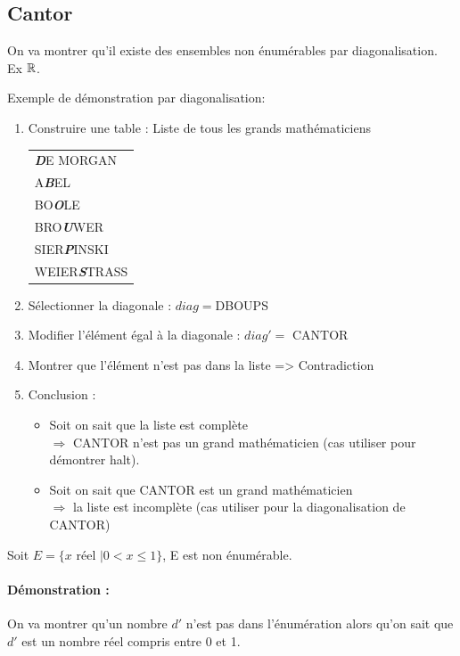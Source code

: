\subsection{Cantor}
\label{sub:cantor}
On va montrer qu'il existe des ensembles non énumérables par diagonalisation. Ex $\mathbb{R}$.
\begin{myexem}
	Exemple de démonstration par diagonalisation: 
	\begin{enumerate}
		\item Construire une table : Liste de tous les grands
			mathématiciens \\	
			\begin{tabular}{l}
				\textit{\textbf{D}}E MORGAN \\
				A\textit{\textbf{B}}EL\\
				BO\textit{\textbf{O}}LE\\
				BRO\textit{\textbf{U}}WER\\
				SIER\textit{\textbf{P}}INSKI\\
				WEIER\textit{\textbf{S}}TRASS\\
			\end{tabular}
		\item Sélectionner la diagonale : $diag = $DBOUPS
		\item Modifier l'élément égal à la diagonale : $diag' =$ CANTOR
		\item Montrer que l'élément n'est pas dans la liste => Contradiction
		\item Conclusion :
			\begin{itemize}
				\item Soit on sait que la liste est complète\\
					$ \Rightarrow$ CANTOR n'est pas un grand
				mathématicien (cas utiliser pour démontrer
				halt).
				\item Soit on sait que CANTOR est un grand
					mathématicien \\
					$ \Rightarrow$ la liste est incomplète
				(cas utiliser pour la diagonalisation de CANTOR)
			\end{itemize}
	\end{enumerate}
\end{myexem}

\begin{mytheo}
	Soit $E = \{ x \text{ réel }|0<x\leq1\}$, E est non énumérable.
\end{mytheo}

\paragraph{Démonstration :}
On va montrer qu'un nombre $d'$ n'est pas dans l'énumération alors qu'on sait
que $d'$ est un nombre réel compris entre 0 et 1.

